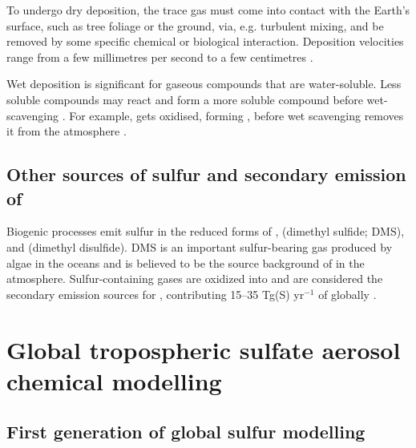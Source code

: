 To undergo dry deposition, the trace gas must come into contact with the Earth's surface, such as tree foliage or the ground, via, e.g. turbulent mixing, and be removed by some specific chemical or biological interaction.  Deposition velocities range from a few millimetres per second to a few centimetres \citep[e.g.][]{smithAirborneTransportSulphur1975, hardacreEvaluationSO2SO422021, mulcahyUKESM11DevelopmentEvaluation2023}.

Wet deposition is significant for gaseous compounds that are water-soluble. Less soluble compounds may react and form a more soluble compound before wet-scavenging \citep{wayneChemistryAtmospheresIntroduction2006}. For example,  gets oxidised, forming , before wet scavenging removes it from the atmosphere \citep{seinfeldAtmosphericChemistryPhysics2016}.


\subsection{Other sources of sulfur and secondary emission of }
\label{ch1:other-so2}

Biogenic processes emit sulfur in the reduced forms of ,  (dimethyl sulfide; DMS), and  (dimethyl disulfide). DMS is an important sulfur-bearing gas produced by algae in the oceans and is believed to be the source background of  in the atmosphere. Sulfur-containing gases are oxidized into  and are considered the secondary emission sources for , contributing 15--35 Tg(S) yr$^{-1}$ of  globally \citep{lanaUpdatedClimatologySurface2011}.



\section{Global tropospheric sulfate aerosol chemical modelling} %
\label{section1.2}

\subsection{First generation of global sulfur modelling}


